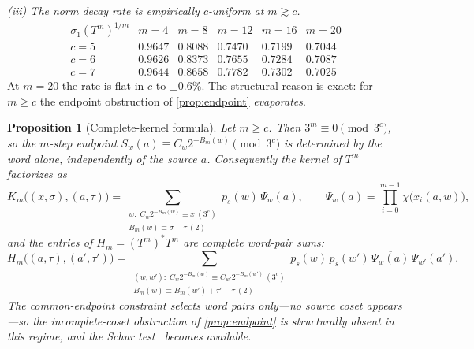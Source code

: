 \documentclass[11pt]{article}
\theoremstyle{plain}
\newtheorem{proposition}{Proposition}
\theoremstyle{definition}
\theoremstyle{remark}
\begin{document}
\emph{(iii) The norm decay rate is empirically $c$-uniform at $m\gtrsim c$.}
\[
\begin{array}{c|ccccc}
\sigma_1(T^m)^{1/m} & m{=}4 & m{=}8 & m{=}12 & m{=}16 & m{=}20\\\hline
c=5 & 0.9647 & 0.8088 & 0.7470 & 0.7199 & 0.7044\\
c=6 & 0.9626 & 0.8373 & 0.7655 & 0.7284 & 0.7087\\
c=7 & 0.9644 & 0.8658 & 0.7782 & 0.7302 & 0.7025
\end{array}
\]
At $m=20$ the rate is flat in $c$ to $\pm0.6\%$. The structural reason is
exact: for $m\ge c$ the endpoint obstruction of \cref{prop:endpoint}
\emph{evaporates}.

\begin{proposition}[Complete-kernel formula]\label{prop:completekernel}
Let $m\ge c$. Then $3^m\equiv0\pmod{3^c}$, so the $m$-step endpoint
$S_w(a)\equiv C_w2^{-B_m(w)}\pmod{3^c}$ is determined by the word alone,
independently of the source $a$. Consequently the kernel of $T^m$ factorizes
as
\[
K_m\bigl((x,\sigma),(a,\tau)\bigr)
=\sum_{\substack{w:\;C_w2^{-B_m(w)}\equiv x\ (3^c)\\ B_m(w)\equiv\sigma-\tau\ (2)}}
p_s(w)\,\Psi_w(a),
\qquad
\Psi_w(a)=\prod_{i=0}^{m-1}\chi\bigl(x_i(a,w)\bigr),
\]
and the entries of $H_m=(T^m)^*T^m$ are \emph{complete word-pair sums}:
\[
H_m\bigl((a,\tau),(a',\tau')\bigr)
=\sum_{\substack{(w,w'):\;C_w2^{-B_m(w)}\equiv C_{w'}2^{-B_m(w')}\ (3^c)\\
B_m(w)\equiv B_m(w')+\tau'-\tau\ (2)}}
p_s(w)\,p_s(w')\,\overline{\Psi_w(a)}\,\Psi_{w'}(a').
\]
The common-endpoint constraint selects word pairs only---no source coset
appears---so the incomplete-coset obstruction of \cref{prop:endpoint} is
structurally absent in this regime, and the Schur test~\cite{schur1911} becomes available.
\end{proposition}
\end{document}
